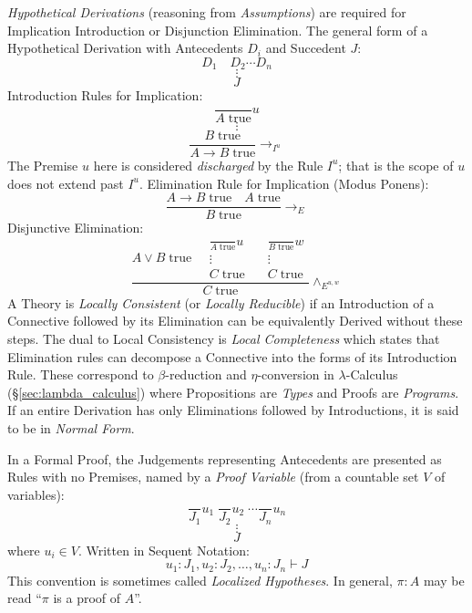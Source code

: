 \documentclass{article}
\begin{document}
\emph{Hypothetical Derivations} (reasoning from \emph{Assumptions})
are required for Implication Introduction or Disjunction
Elimination. The general form of a Hypothetical Derivation with
Antecedents $D_i$ and Succedent $J$:
\[
    D_1 \quad D_2 \cdots D_n
\]\[
    \vdots
\]\[
    J
\]
Introduction Rules for Implication:
\[
    {
        \frac{}
        {A\;\mathrm{true}}
    } u
\]\[
    \vdots
\]\[
    {
        \frac{B\;\mathrm{true}}
        {A \rightarrow B\;\mathrm{true}}
    } \rightarrow_{I^u}
\]
The Premise $u$ here is considered \emph{discharged} by the Rule
$I^u$; that is the scope of $u$ does not extend past $I^u$.
Elimination Rule for Implication (Modus Ponens):
\[
    {
        \frac{A \rightarrow B\;\mathrm{true} \quad A\;\mathrm{true}}
        {B\;\mathrm{true}}
    } \rightarrow_{E}
\]
Disjunctive Elimination:
\[
    \frac{
    A \vee B\;\mathrm{true} \quad
    \begin{matrix}
        {
            \frac{}
            {A\;\mathrm{true}}
        }u \\
        \vdots \\
        C\;\mathrm{true}
    \end{matrix}
    \quad
    \begin{matrix}
        {
            \frac{}
            {B\;\mathrm{true}}
        }w \\
        \vdots \\
        C\;\mathrm{true}
    \end{matrix}
    }{ C\;\mathrm{true}}\wedge_{E^{u,w}}
\]
A Theory is \emph{Locally Consistent} (or \emph{Locally Reducible}) if
an Introduction of a Connective followed by its Elimination can be
equivalently Derived without these steps.  The dual to Local
Consistency is \emph{Local Completeness} which states that Elimination
rules can decompose a Connective into the forms of its Introduction
Rule. These correspond to $\beta$-reduction and $\eta$-conversion in
$\lambda$-Calculus (\S\ref{sec:lambda_calculus}) where Propositions
are \emph{Types} and Proofs are \emph{Programs}. If an entire
Derivation has only Eliminations followed by Introductions, it is said
to be in \emph{Normal Form}.

In a Formal Proof, the Judgements representing Antecedents are
presented as Rules with no Premises, named by a \emph{Proof Variable}
(from a countable set $V$ of variables):
\[
    \frac{}{J_1}u_1 \; \frac{}{J_2}u_2 \; \cdots \frac{}{J_n}u_n
\]\[
    \vdots
\]\[
    J
\]
where $u_i \in V$. Written in Sequent Notation:
\[
    u_1:J_1, u_2:J_2, \ldots, u_n:J_n \vdash J
\]
This convention is sometimes called \emph{Localized Hypotheses}. In
general, $\pi : A$ may be read ``$\pi$ is a proof of $A$''.
\end{document}
